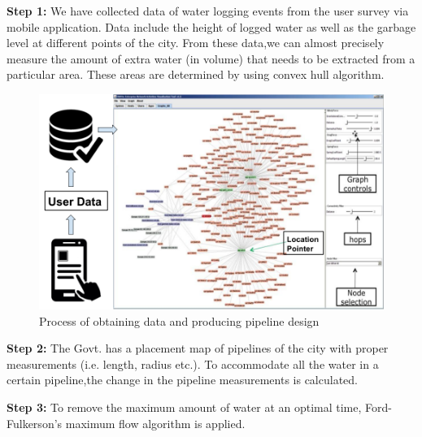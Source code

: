 \documentclass{acm_proc_article-sp}
\begin{document}
\textbf{Step 1:} We have collected data of water logging events from the user survey via mobile application. Data include the height of logged water as well as the garbage level at different points of the city. From these data,we can almost precisely measure the amount of extra water (in volume) that needs to be extracted from a particular area. These areas are determined by using convex hull algorithm.
\begin{figure}[ht!]
\centering
\includegraphics[width=1.0\linewidth]{flow.png}
\caption{Process of obtaining data and producing pipeline design}
\end{figure}


\textbf{Step 2:} The Govt. has a placement map of pipelines of the city with proper measurements (i.e. length, radius etc.). To accommodate all the water in a certain pipeline,the change in the pipeline measurements is calculated. 

\textbf{Step 3:} To remove the maximum amount of water at an optimal time, Ford-Fulkerson's maximum flow algorithm is applied. 





\end{document}
